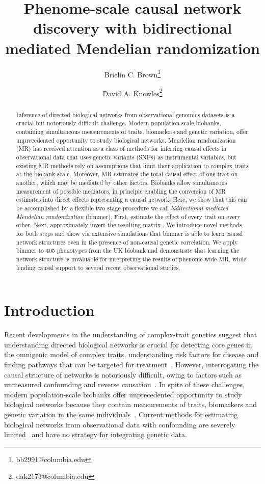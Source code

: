 \documentclass{article}
\title{Phenome-scale causal network discovery with
bidirectional mediated Mendelian randomization}
\author[1, 2]{Brielin C. Brown\thanks{bb2991@columbia.edu}}
\author[2, 3, 4]{David A. Knowles\thanks{dak2173@columbia.edu}}
\affil[1]{Data Science Institute, Columbia University, New York, NY}
\affil[2]{New York Genome Center, New York, NY}
\affil[3]{Department of Computer Science, Columbia University, New York, NY}
\affil[4]{Department of Systems Biology, Columbia University, New York, NY}
\date{}
\begin{document}
\maketitle

\begin{abstract}
Inference of directed biological networks from observational genomics  datasets is a crucial
but notoriously difficult challenge. Modern population-scale biobanks, containing simultaneous
measurements of traits, biomarkers and genetic variation, offer unprecedented opportunity
to study biological networks. Mendelian randomization (MR) has received attention as a class
of methods for inferring causal effects in observational data that uses genetic variants (SNPs)
as instrumental variables, but existing MR methods rely on assumptions that limit their application
to complex traits at the biobank-scale. Moreover, MR estimates the total causal effect of one trait 
on another, which may be mediated by other factors. Biobanks allow simultaneous measurement 
of possible mediators, in principle enabling the conversion of MR estimates into direct effects 
representing a causal network.
Here, we show that this can be accomplished by a flexible two stage procedure we call
\emph{bidirectional mediated Mendelian randomization} (bimmer). First,
estimate the effect of every trait on every other. Next, approximately invert the resulting matrix .
We introduce novel methods for both steps and show via extensive simulations that bimmer is able
to learn causal network structures even in the presence of non-causal 
genetic correlation. We apply bimmer to 405 
phenotypes from the UK biobank and demonstrate that learning the network structure is invaluable 
for interpreting the results of phenome-wide MR, while lending causal support to several
recent observational studies.
\end{abstract}

\section{Introduction}
Recent developments in the understanding of complex-trait genetics suggest that 
understanding directed biological networks is crucial for detecting core genes in the omnigenic model of complex traits,
understanding risk factors for disease and finding pathways that can be targeted
for treatment~\cite{Boyle2017,Liu2019,Wray2018}.
However, interrogating the causal structure of networks is notoriously difficult,
owing to factors such as unmeasured confounding and reverse causation~\cite{Parsana2019}.
In spite of these challenges, modern population-scale biobanks 
offer unprecedented opportunity to study biological networks
 because they contain measurements of
traits, biomarkers and genetic variation in the same individuals~\cite{Sudlow2015,Nagai2017}.
Current methods for estimating biological networks from observational data with confounding
are severely limited~\cite{Chandrasekaran2012,Frot2019a,Frot2019b,Stegle2011} and have no strategy
for integrating genetic data.
\end{document}
